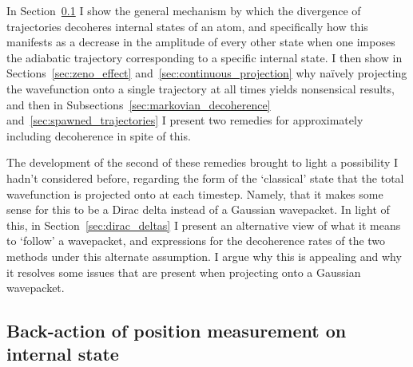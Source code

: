 In Section~\ref{sec:backaction} I show the general mechanism by which the divergence of trajectories decoheres internal states of an atom, and specifically how this manifests as a decrease in the amplitude of every other state when one imposes the adiabatic trajectory corresponding to a specific internal state. I then show in Sections~\ref{sec:zeno_effect} and~\ref{sec:continuous_projection} why na\"ively projecting the wavefunction onto a single trajectory at all times yields nonsensical results, and then in Subsections~\ref{sec:markovian_decoherence} and~\ref{sec:spawned_trajectories} I present two remedies for approximately including decoherence in spite of this. 

The development of the second of these remedies brought to light a possibility I hadn't considered before, regarding the form of the `classical' state that the total wavefunction is projected onto at each timestep. Namely, that it makes some sense for this to be a Dirac delta instead of a Gaussian wavepacket. In light of this, in Section~\ref{sec:dirac_deltas} I present an alternative view of what it means to `follow' a wavepacket, and expressions for the decoherence rates of the two methods under this alternate assumption. I argue why this is appealing and why it resolves some issues that are present when projecting onto a Gaussian wavepacket.

\subsection{Back-action of position measurement on internal state}\label{sec:backaction}

